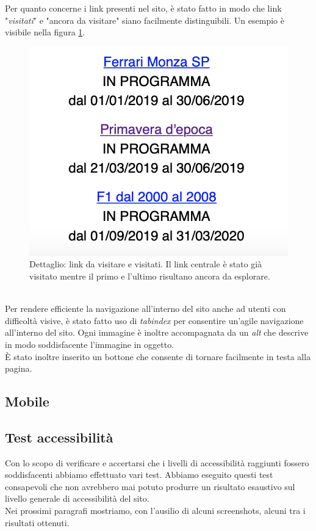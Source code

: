 Per quanto concerne i link presenti nel sito, è stato fatto in modo che link "\textit{visitati}" e "ancora da visitare" siano facilmente distinguibili. Un esempio è visibile nella figura \ref{fig:linkVisitatiDaVisitare}.
\begin{figure}[h]
	\begin{center}
		\includegraphics[scale=0.3]{Images/linkVisitatiDaVisitare.png}
		\caption{Dettaglio: link da visitare e visitati. Il link centrale è stato già visitato mentre il primo e l'ultimo risultano ancora da esplorare.}
		\label{fig:linkVisitatiDaVisitare}
	\end{center}
\end{figure}\\
Per rendere efficiente la navigazione all'interno del sito anche ad utenti con difficoltà visive, è stato fatto uso di \textit{tabindex} per consentire un'agile navigazione all'interno del sito. Ogni immagine è inoltre accompagnata da un \textit{alt} che descrive in modo soddisfacente l'immagine in oggetto.\\
È stato inoltre inserito un bottone che consente di tornare facilmente in testa alla pagina.

\subsection{Mobile}
\subsection{Test accessibilità}
Con lo scopo di verificare e accertarsi che i livelli di accessibilità raggiunti fossero soddisfacenti abbiamo effettuato vari test. Abbiamo eseguito questi test consapevoli che non avrebbero mai potuto produrre un risultato esaustivo sul livello generale di accessibilità del sito.\\
Nei prossimi paragrafi mostriamo, con l'ausilio di alcuni screenshots, alcuni tra i risultati ottenuti.
